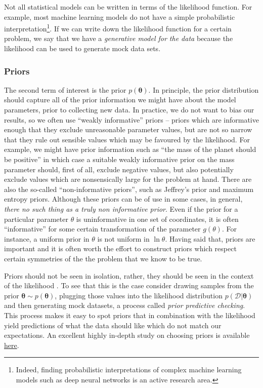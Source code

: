 \documentclass[12pt,dvipsnames]{report}
\renewcommand{\vec}[1]{\boldsymbol{\mathbf{#1}}}
\begin{document}
Not all statistical models can be written in terms of the likelihood function.
For example, most machine learning models do not have a simple probabilistic
interpretation\footnote{Indeed, finding probabilistic interpretations of
    complex machine learning models such as deep neural networks is an active
    research area.}. If we can write down the likelihood function for a certain
problem, we say that we have a \emph{generative model for the data} because the
likelihood can be used to generate mock data sets.

\subsubsection{Priors}
The second term of interest is the prior $p(\vec{\theta})$. In principle, the
prior distribution should capture all of the prior information we might have about the
model parameters, prior to collecting new data. In practice, we do not want to
bias our results, so we often use ``weakly informative'' priors -- priors
which are informative enough that they exclude unreasonable parameter values, but
are not so narrow that they rule out sensible values which may be favoured by the
likelihood. For example, we might have prior information such as ``the mass of
the planet should be positive'' in which case a suitable weakly informative
prior on the mass parameter should, first of all, exclude negative values, but
also potentially exclude values which are nonsensically large for the problem
at hand. There are also the so-called ``non-informative priors'', such as
Jeffrey's prior and maximum entropy priors. Although these priors can be of use
in some cases, in general, \emph{there no such thing as a truly non
    informative prior}. Even if the prior for a particular parameter $\theta$ is
uninformative in one set of coordinates, it is often ``informative'' for some
certain transformation of the parameter $g(\theta)$. For instance, a uniform
prior in $\theta$ is not uniform in $\ln\theta$. Having said that, priors are important 
and it is often
worth the effort to construct priors which respect certain symmetries of the
the problem that we know to be true.

Priors should not be seen in isolation, rather, they should be seen in the
context of the likelihood \citep{arXiv:1708.07487}. To see that this is the
case consider drawing samples from the prior $\vec{\theta}\sim
    p(\vec{\theta})$, plugging those values into the likelihood distribution
$p(\mathcal{D}|\vec{\theta})$ and then generating mock datasets, a process
called \emph{prior predictive checking}. This process makes it easy to spot
priors that in combination with the likelihood yield predictions of what the
data should like which do not match our expectations. An excellent highly
in-depth study on choosing priors is available
\href{https://betanalpha.github.io/assets/case_studies/prior_modelling.html}{here}.
\end{document}
